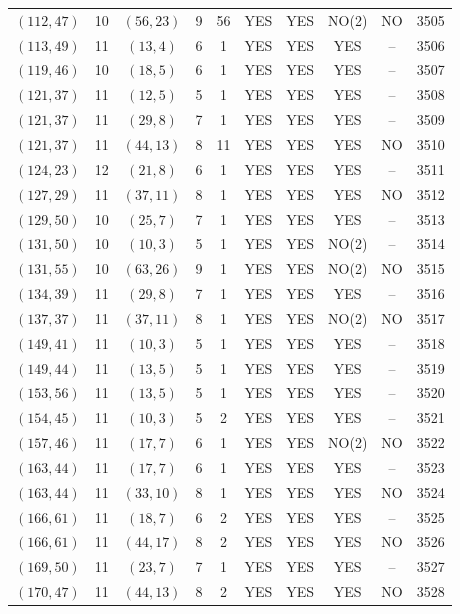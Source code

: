 \begin{longtable}{|c|c|c|c|c|c|c|c|c|c|}
$(112, 47)$ & 10 & $(56, 23)$ & 9 & 56 & YES & YES & NO(2) & NO & 3505\\
$(113, 49)$ & 11 & $(13, 4)$ & 6 & 1 & YES & YES & YES & -- & 3506\\
$(119, 46)$ & 10 & $(18, 5)$ & 6 & 1 & YES & YES & YES & -- & 3507\\
$(121, 37)$ & 11 & $(12, 5)$ & 5 & 1 & YES & YES & YES & -- & 3508\\
$(121, 37)$ & 11 & $(29, 8)$ & 7 & 1 & YES & YES & YES & -- & 3509\\
$(121, 37)$ & 11 & $(44, 13)$ & 8 & 11 & YES & YES & YES & NO & 3510\\
$(124, 23)$ & 12 & $(21, 8)$ & 6 & 1 & YES & YES & YES & -- & 3511\\
$(127, 29)$ & 11 & $(37, 11)$ & 8 & 1 & YES & YES & YES & NO & 3512\\
$(129, 50)$ & 10 & $(25, 7)$ & 7 & 1 & YES & YES & YES & -- & 3513\\
$(131, 50)$ & 10 & $(10, 3)$ & 5 & 1 & YES & YES & NO(2) & -- & 3514\\
$(131, 55)$ & 10 & $(63, 26)$ & 9 & 1 & YES & YES & NO(2) & NO & 3515\\
$(134, 39)$ & 11 & $(29, 8)$ & 7 & 1 & YES & YES & YES & -- & 3516\\
$(137, 37)$ & 11 & $(37, 11)$ & 8 & 1 & YES & YES & NO(2) & NO & 3517\\
$(149, 41)$ & 11 & $(10, 3)$ & 5 & 1 & YES & YES & YES & -- & 3518\\
$(149, 44)$ & 11 & $(13, 5)$ & 5 & 1 & YES & YES & YES & -- & 3519\\
$(153, 56)$ & 11 & $(13, 5)$ & 5 & 1 & YES & YES & YES & -- & 3520\\
$(154, 45)$ & 11 & $(10, 3)$ & 5 & 2 & YES & YES & YES & -- & 3521\\
$(157, 46)$ & 11 & $(17, 7)$ & 6 & 1 & YES & YES & NO(2) & NO & 3522\\
$(163, 44)$ & 11 & $(17, 7)$ & 6 & 1 & YES & YES & YES & -- & 3523\\
$(163, 44)$ & 11 & $(33, 10)$ & 8 & 1 & YES & YES & YES & NO & 3524\\
$(166, 61)$ & 11 & $(18, 7)$ & 6 & 2 & YES & YES & YES & -- & 3525\\
$(166, 61)$ & 11 & $(44, 17)$ & 8 & 2 & YES & YES & YES & NO & 3526\\
$(169, 50)$ & 11 & $(23, 7)$ & 7 & 1 & YES & YES & YES & -- & 3527\\
$(170, 47)$ & 11 & $(44, 13)$ & 8 & 2 & YES & YES & YES & NO & 3528\\

\end{longtable}
